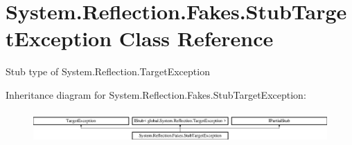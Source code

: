 \hypertarget{class_system_1_1_reflection_1_1_fakes_1_1_stub_target_exception}{\section{System.\-Reflection.\-Fakes.\-Stub\-Target\-Exception Class Reference}
\label{class_system_1_1_reflection_1_1_fakes_1_1_stub_target_exception}
}


Stub type of System.\-Reflection.\-Target\-Exception 


Inheritance diagram for System.\-Reflection.\-Fakes.\-Stub\-Target\-Exception\-:\begin{figure}[H]
\begin{center}
\leavevmode
\includegraphics[height=1.224044cm]{class_system_1_1_reflection_1_1_fakes_1_1_stub_target_exception}
\end{center}
\end{figure}
